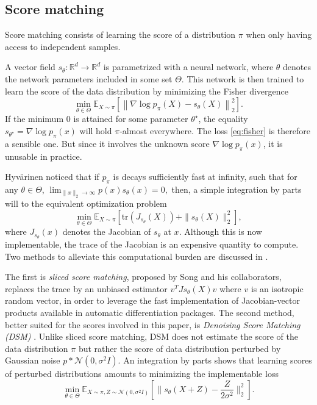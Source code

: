 \documentclass[11pt,twoside]{article}
\newcommand{\E}{\mathbb{E}}
\newcommand{\R}{\mathbb{R}}
\begin{document}
\subsection{Score matching}

Score matching consists of learning the score of a distribution $\pi$ when only having access to independent samples.

A vector field $s_\theta: \R^d \rightarrow \R^d$ is parametrized with a neural network, where $\theta$ denotes the network parameters included in some set $\Theta$. This network is then trained to learn the score of the data distribution by minimizing the Fisher divergence 
\begin{equation}
\min_{\theta \in \Theta} \E_{X \sim \pi} \left[ \left\| \nabla \log p_\pi(X) - s_\theta(X) \right\|_2^2\right].
\label{eq:fisher}
\end{equation}
If the minimum $0$ is attained for some parameter $\theta^\star$, the equality $s_{\theta^\star} = \nabla \log p_\pi(x)$ will hold $\pi$-almost everywhere. The loss \eqref{eq:fisher} is therefore a sensible one. But since it involves the unknown score $\nabla \log p_\pi(x)$, it is unusable in practice.

Hyv\"arinen \cite{hyvarinen_estimation_2005} noticed that if $p_\pi$ is decays sufficiently fast at infinity, such that for any $\theta \in \Theta$,
\(
 \lim_{\|x\|_2 \rightarrow \infty} p(x)s_\theta(x) =0,
\)
then, a simple integration by parts will to the equivalent optimization problem
\begin{equation}
\min_{\theta \in \Theta} \E_{X \sim \pi} \left[ \text{tr}(J_{s_\theta}(X)) + \|s_\theta(X)\|_2^2\right],
\label{eq:tractable-score}
\end{equation}
where $J_{s_\theta}(x)$ denotes the Jacobian of $s_\theta$ at $x$. Although this is now implementable, the trace of the Jacobian is an expensive quantity to compute. Two methods to alleviate this computational burden are discussed in \cite{song_generative_2019}.

The first is \textit{sliced score matching}, proposed by Song and his collaborators, replaces the trace by an unbiased estimator $v^TJ{s_\theta}(X)v$ where $v$ is an isotropic random vector, in order to leverage the fast implementation of Jacobian-vector products available in automatic differentiation packages. The second method, better suited for the scores involved in this paper, is \textit{Denoising Score Matching (DSM)} \cite{vincent_connection_2011}. Unlike sliced score matching, DSM does not estimate the score of the data distribution $\pi$ but rather the score of data distribution perturbed by Gaussian noise $p * \mathcal{N}(0, \sigma^2I)$. An integration by parts shows that learning scores of perturbed distributions amounts to minimizing the implementable loss
\[
\min_{\theta \in \Theta} \E_{X \sim \pi, Z \sim \mathcal{N}(0, \sigma^2I)} \left[ \|s_\theta(X + Z) -  \frac{Z}{2\sigma^2}\|_2^2\right].
\]
\end{document}

